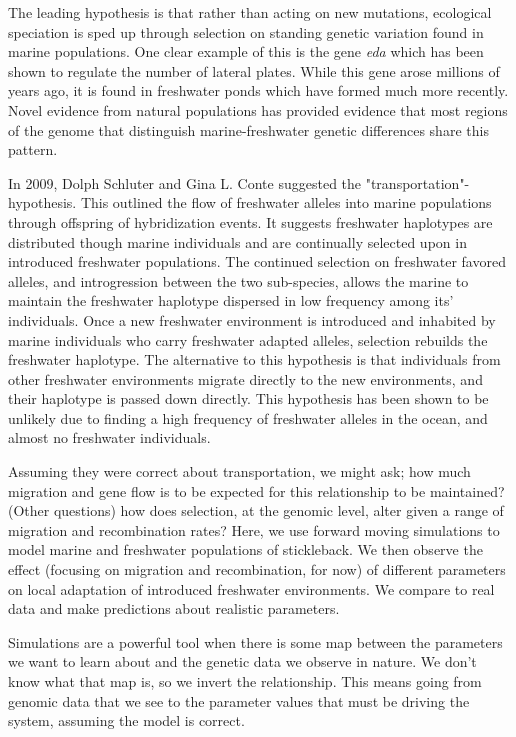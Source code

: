 \documentclass{article}
\begin{document}
The leading hypothesis is that rather than acting on new mutations, ecological speciation is sped up through selection on standing genetic variation found in marine populations. 
One clear example of this is the gene \textit{eda} 
which has been shown to regulate the number of lateral plates. 
While this gene arose millions of years ago, 
it is found in freshwater ponds which have formed much more recently.
Novel evidence from natural populations has provided evidence that most regions of the genome that distinguish marine-freshwater genetic differences share this pattern. \cite{Nelson2017} 

In 2009, Dolph Schluter and Gina L. Conte suggested the "transportation"-hypothesis. 
This outlined the flow of freshwater alleles into marine populations through offspring of hybridization events.
It suggests freshwater haplotypes are distributed though marine individuals and are continually selected upon in introduced freshwater populations.
The continued selection on freshwater favored alleles,
and introgression between the two sub-species,
allows the marine to maintain the freshwater haplotype dispersed in low frequency among its' individuals. 
Once a new freshwater environment is introduced and inhabited by marine individuals who carry freshwater adapted alleles, selection rebuilds the freshwater haplotype. \cite{Schluter2009} 
The alternative to this hypothesis is that individuals from other freshwater environments migrate directly to the new environments, and their haplotype is passed down directly. 
This hypothesis has been shown to be unlikely due to 
finding a high frequency of freshwater alleles in the ocean,
and almost no freshwater individuals. 

Assuming they were correct about transportation, we might ask; 
how much migration and gene flow is to be expected for this relationship to be maintained?
(Other questions)
how does selection, at the genomic level, alter given a range of migration and recombination rates?
Here, we use forward moving simulations to model marine and freshwater populations of stickleback.
We then observe the effect (focusing on migration and recombination, for now) 
of different parameters on local adaptation of introduced freshwater environments. 
We compare to real data and make predictions about realistic parameters. 

Simulations are a powerful tool when there is some map between the parameters we want to learn about
and the genetic data we observe in nature. 
We don't know what that map is, so we invert the relationship. 
This means going from genomic data that we see to the parameter values that must be driving the system, 
assuming the model is correct. 
\end{document}
